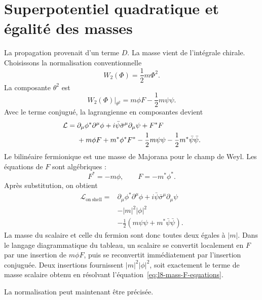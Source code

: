 \section{Superpotentiel quadratique et égalité des masses}

La propagation provenait d’un terme \(D\). La masse vient de l’intégrale chirale. Choisissons la normalisation conventionnelle
\begin{equation}
W_2(\Phi)=\frac12m\Phi^2.
\end{equation}
La composante \(\theta^2\) est
\begin{equation}
\left.W_2(\Phi)\right|_{\theta^2}
=m\phi F-\frac12m\psi\psi.
\end{equation}
Avec le terme conjugué, la lagrangienne en composantes devient
\begin{align}
\mathcal L
={}&
\partial_\mu\phi^\ast\partial^\mu\phi
+i\bar\psi\bar\sigma^\mu\partial_\mu\psi
+F^\ast F
\notag\\
&+m\phi F+m^\ast\phi^\ast F^\ast
-\frac12m\psi\psi
-\frac12m^\ast\bar\psi\bar\psi.
\label{eq:l8-mass-offshell}
\end{align}
Le bilinéaire fermionique est une masse de Majorana pour le champ de Weyl. Les équations de \(F\) sont algébriques :
\begin{equation}
F^\ast=-m\phi,
\qquad
F=-m^\ast\phi^\ast.
\label{eq:l8-mass-F-equations}
\end{equation}
Après substitution, on obtient
\begin{equation}
\begin{aligned}
\mathcal L_{\mathrm{on\ shell}}={}&
\partial_\mu\phi^\ast\partial^\mu\phi
+i\bar\psi\bar\sigma^\mu\partial_\mu\psi\\
&-|m|^2|\phi|^2\\
&-\frac12\left(m\psi\psi+m^\ast\bar\psi\bar\psi\right).
\end{aligned}
\label{eq:l8-mass-onshell}
\end{equation}
La masse du scalaire et celle du fermion sont donc toutes deux égales à \(|m|\). Dans le langage diagrammatique du tableau, un scalaire se convertit localement en \(F\) par une insertion de \(m\phi F\), puis se reconvertit immédiatement par l’insertion conjuguée. Deux insertions fournissent \(|m|^2|\phi|^2\), soit exactement le terme de masse scalaire obtenu en résolvant l’équation~\eqref{eq:l8-mass-F-equations}.

La normalisation peut maintenant être précisée.


